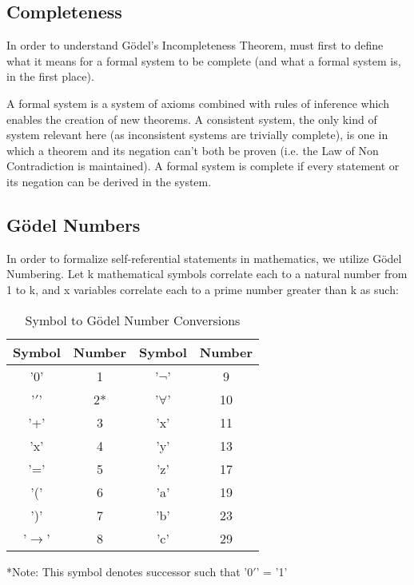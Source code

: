 \documentclass[conference]{IEEEtran}
\begin{document}
\subsection{Completeness}
In order to understand Gödel's Incompleteness Theorem, must first to define what it means for a formal system to be complete (and what a formal system is, in the first place). 

A formal system is a system of axioms combined with rules of inference which enables the creation of new theorems. A consistent system, the only kind of system relevant here (as inconsistent systems are trivially complete), is one in which a theorem and its negation can't both be proven (i.e. the Law of Non Contradiction is maintained). A formal system is complete if every statement or its negation can be derived in the system. 

\subsection{Gödel Numbers}
In order to formalize self-referential statements in mathematics, we utilize Gödel Numbering. Let k mathematical symbols correlate each to a natural number from 1 to k, and x variables correlate each to a prime number greater than k as such:
\begin{table}[htbp]
\caption{Symbol to Gödel Number Conversions}
\begin{center}
\begin{tabular}{ |c|c||c|c| } 
 \hline
 Symbol & Number & Symbol & Number \\ 
 \hline
 \hline
 '0' & 1 & '$\neg$' & 9 \\ 
 \hline
 '$'$' & 2* & '$\forall$' & 10 \\ 
 \hline 
 '+' & 3 & 'x' & 11 \\ 
 \hline
 'x' & 4 & 'y' & 13 \\ 
 \hline
 '=' & 5 & 'z' & 17 \\ 
 \hline
 '(' & 6 & 'a' & 19 \\ 
 \hline
 ')' & 7 & 'b' & 23 \\ 
 \hline
 '$\rightarrow$' & 8 & 'c' & 29 \\ 
 \hline
 
\end{tabular}
\end{center}
\begin{center}
    *Note: This symbol denotes successor such that '0$'$' = '1'
\end{center}
\end{table}
\end{document}
